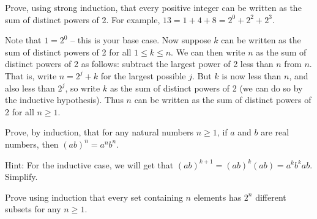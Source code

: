 \begin{questions}
	\begin{answer}
	\end{answer}



\question Prove, using strong induction, that every positive integer can be written as the sum of distinct powers of 2.  For example, $13 = 1 + 4 + 8 = 2^0 + 2^2 + 2^3$.

	\begin{answer}
		Note that $1 = 2^0$ -- this is your base case.  Now suppose $k$ can be written as the sum of distinct powers of 2 for all $1\le k \le n$.  We can then write $n$ as the sum of distinct powers of 2 as follows: subtract the largest power of 2 less than $n$ from $n$.  That is, write $n = 2^j + k$ for the largest possible $j$.  But $k$ is now less than $n$, and also less than $2^j$, so write $k$ as the sum of distinct powers of 2 (we can do so by the inductive hypothesis).  Thus $n$ can be written as the sum of distinct powers of 2 for all $n \ge 1$.
	\end{answer}



\question  Prove, by induction, that for any natural numbers $n \ge 1$, if $a$ and $b$ are real numbers, then $(ab)^n = a^nb^n$.

	\begin{answer}
		Hint: For the inductive case, we will get that $(ab)^{k+1} = (ab)^k(ab) = a^kb^kab$.  Simplify.
	\end{answer}

\question Prove using induction that every set containing $n$ elements has $2^n$ different subsets for any $n \ge 1$.


\end{questions}
